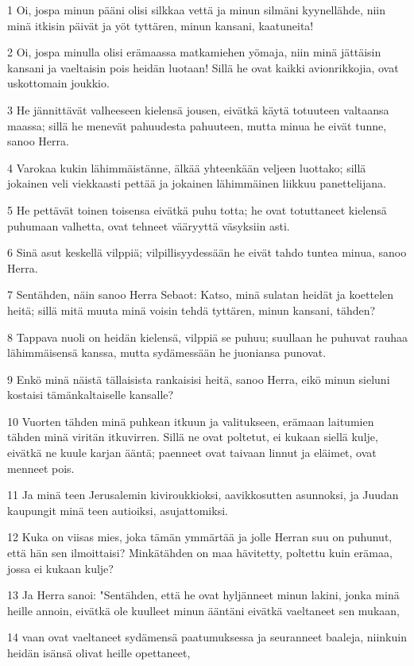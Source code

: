 \par 1 Oi, jospa minun pääni olisi silkkaa vettä ja minun silmäni kyynellähde, niin minä itkisin päivät ja yöt tyttären, minun kansani, kaatuneita!
\par 2 Oi, jospa minulla olisi erämaassa matkamiehen yömaja, niin minä jättäisin kansani ja vaeltaisin pois heidän luotaan! Sillä he ovat kaikki avionrikkojia, ovat uskottomain joukkio.
\par 3 He jännittävät valheeseen kielensä jousen, eivätkä käytä totuuteen valtaansa maassa; sillä he menevät pahuudesta pahuuteen, mutta minua he eivät tunne, sanoo Herra.
\par 4 Varokaa kukin lähimmäistänne, älkää yhteenkään veljeen luottako; sillä jokainen veli viekkaasti pettää ja jokainen lähimmäinen liikkuu panettelijana.
\par 5 He pettävät toinen toisensa eivätkä puhu totta; he ovat totuttaneet kielensä puhumaan valhetta, ovat tehneet vääryyttä väsyksiin asti.
\par 6 Sinä asut keskellä vilppiä; vilpillisyydessään he eivät tahdo tuntea minua, sanoo Herra.
\par 7 Sentähden, näin sanoo Herra Sebaot: Katso, minä sulatan heidät ja koettelen heitä; sillä mitä muuta minä voisin tehdä tyttären, minun kansani, tähden?
\par 8 Tappava nuoli on heidän kielensä, vilppiä se puhuu; suullaan he puhuvat rauhaa lähimmäisensä kanssa, mutta sydämessään he juoniansa punovat.
\par 9 Enkö minä näistä tällaisista rankaisisi heitä, sanoo Herra, eikö minun sieluni kostaisi tämänkaltaiselle kansalle?
\par 10 Vuorten tähden minä puhkean itkuun ja valitukseen, erämaan laitumien tähden minä viritän itkuvirren. Sillä ne ovat poltetut, ei kukaan siellä kulje, eivätkä ne kuule karjan ääntä; paenneet ovat taivaan linnut ja eläimet, ovat menneet pois.
\par 11 Ja minä teen Jerusalemin kiviroukkioksi, aavikkosutten asunnoksi, ja Juudan kaupungit minä teen autioiksi, asujattomiksi.
\par 12 Kuka on viisas mies, joka tämän ymmärtää ja jolle Herran suu on puhunut, että hän sen ilmoittaisi? Minkätähden on maa hävitetty, poltettu kuin erämaa, jossa ei kukaan kulje?
\par 13 Ja Herra sanoi: "Sentähden, että he ovat hyljänneet minun lakini, jonka minä heille annoin, eivätkä ole kuulleet minun ääntäni eivätkä vaeltaneet sen mukaan,
\par 14 vaan ovat vaeltaneet sydämensä paatumuksessa ja seuranneet baaleja, niinkuin heidän isänsä olivat heille opettaneet,
